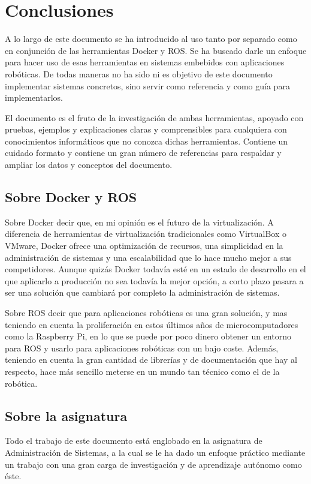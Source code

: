 \chapter{Conclusiones}
A lo largo de este documento se ha introducido al uso tanto por separado como en conjunción de las herramientas Docker y ROS. Se ha buscado darle un enfoque para hacer uso de esas herramientas en sistemas embebidos con aplicaciones robóticas. De todas maneras no ha sido ni es objetivo de este documento implementar sistemas concretos, sino servir como referencia y como guía para implementarlos.

El documento es el fruto de la investigación de ambas herramientas, apoyado con pruebas, ejemplos y explicaciones claras y comprensibles para cualquiera con conocimientos informáticos que no conozca dichas herramientas. Contiene un cuidado formato y contiene un gran número de referencias para respaldar y ampliar los datos y conceptos del documento.

	\section{Sobre Docker y ROS}
	Sobre Docker decir que, en mi opinión es el futuro de la virtualización. A diferencia de herramientas de virtualización tradicionales como VirtualBox o VMware, Docker ofrece una optimización de recursos, una simplicidad en la administración de sistemas y una escalabilidad que lo hace mucho mejor a sus competidores. Aunque quizás Docker todavía esté en un estado de desarrollo en el que aplicarlo a producción no sea todavía la mejor opción, a corto plazo pasara a ser una solución que cambiará por completo la administración de sistemas.
	
	Sobre ROS decir que para aplicaciones robóticas es una gran solución, y mas teniendo en cuenta la proliferación en estos últimos años de microcomputadores como la Raspberry Pi, en lo que se puede por poco dinero obtener un entorno para ROS y usarlo para aplicaciones robóticas con un bajo coste. Además, teniendo en cuenta la gran cantidad de librerías y de documentación que hay al respecto, hace más sencillo meterse en un mundo tan técnico como el de la robótica.
	
	\section{Sobre la asignatura}
	Todo el trabajo de este documento está englobado en la asignatura de Administración de Sistemas, a la cual se le ha dado un enfoque práctico mediante un trabajo con una gran carga de investigación y de aprendizaje autónomo como éste.
	
